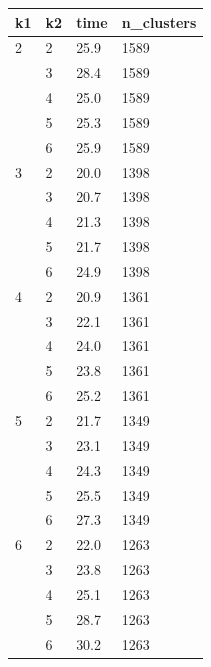 \documentclass[12pt]{article}
\begin{document}
\begin{minipage}\linewidth
\centering
{} \label{tab3:title} 
\begin{tabular}{llll}
\toprule
 k1 & k2  &      time & n\_clusters \\
\midrule
2  & 2 &  25.9 &       1589 \\
  & 3 &  28.4 &       1589 \\
  & 4 &  25.0 &       1589 \\
  & 5 &  25.3 &       1589 \\
 & 6 &  25.9 &       1589 \\
3  & 2 &  20.0 &       1398 \\
  & 3 &  20.7 &       1398 \\
  & 4 &  21.3 &       1398 \\
  & 5 &  21.7 &       1398 \\
 & 6 &  24.9 &       1398 \\
4  & 2 &  20.9 &       1361 \\
  & 3 &  22.1 &       1361 \\
  & 4 &  24.0 &       1361 \\
  & 5 &  23.8 &       1361 \\
 & 6 &  25.2 &       1361 \\
5  & 2 &  21.7 &       1349 \\
  & 3 &   23.1 &       1349 \\
  & 4 &  24.3 &       1349 \\
  & 5 &  25.5 &       1349 \\
 & 6 &  27.3 &       1349 \\
6  & 2 &  22.0 &       1263 \\
  & 3 &  23.8 &       1263 \\
  & 4 &  25.1 &       1263 \\
  & 5 &  28.7 &       1263 \\
  & 6 &  30.2 &       1263 \\
\bottomrule
\end{tabular}
\end{minipage}
\end{document}

